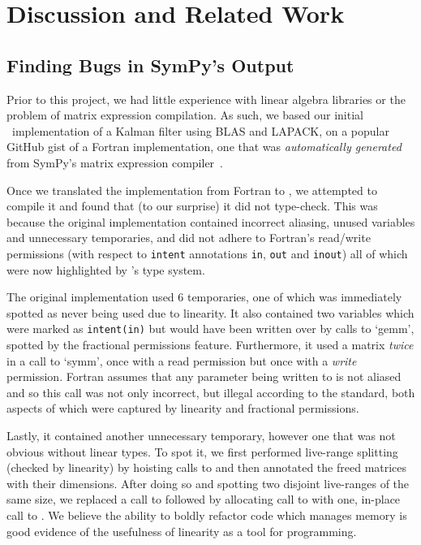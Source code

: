 \section{Discussion and Related Work}\label{sec:discussion_related_work}

\subsection{Finding Bugs in SymPy's Output}\label{subsec:finding_bugs}

Prior to this project, we had little experience with linear algebra libraries
or the problem of matrix expression compilation. As such, we based our initial
\lang\ implementation of a Kalman filter using BLAS and LAPACK, on a popular
GitHub gist of a Fortran implementation, one that was \emph{automatically
generated} from SymPy's matrix expression compiler~\cite{rocklin_thesis}.

Once we translated the implementation from Fortran to \lang, we attempted to
compile it and found that (to our surprise) it did not type-check. This was
because the original implementation contained incorrect aliasing, unused
variables and unnecessary temporaries, and did not adhere to Fortran's
read/write permissions (with respect to \texttt{intent} annotations
\texttt{in}, \texttt{out} and \texttt{inout}) all of which were now highlighted
by \lang's type system.

The original implementation used 6 temporaries, one of which was immediately
spotted as never being used due to linearity. It also contained two variables
which were marked as \texttt{intent(in)} but would have been written over by
calls to `gemm', spotted by the fractional permissions feature. Furthermore,
it used a matrix \emph{twice} in a call to `symm', once with a read permission
but once with a \emph{write} permission.  Fortran assumes that any parameter
being written to is not aliased and so this call was not only incorrect, but
illegal according to the standard, both aspects of which were captured by
linearity and fractional permissions.

Lastly, it contained another unnecessary temporary, however one that was not
obvious without linear types. To spot it, we first performed live-range
splitting (checked by linearity) by hoisting calls to  and then
annotated the freed matrices with their dimensions.  After doing so and
spotting two disjoint live-ranges of the same size, we replaced a call to
 followed by allocating call to  with one, in-place
call to . We believe the ability to boldly refactor code which
manages memory is good evidence of the usefulness of linearity as a tool for
programming.

